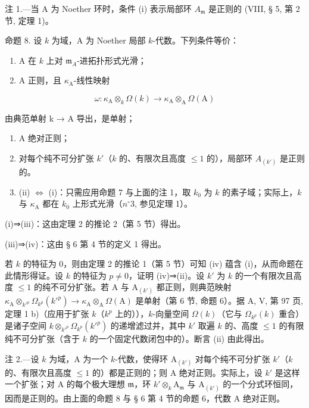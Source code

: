 注 1.—当 A 为 Noether 环时，条件 (i) 表示局部环 \(A_{\mathfrak{m}}\) 是正则的 (VIII, § 5, 第 2 节, 定理 1)。

命题 8. 设 \(k\) 为域，A 为 Noether 局部 \(k\)-代数。下列条件等价：

\begin{enumerate}
\def\labelenumi{(\roman{enumi})}
\item
  A 在 \(k\) 上对 \(\mathfrak{m}_{A}\)-进拓扑形式光滑；
\item
  A 正则，且 \(\kappa_{\mathrm{A}}\)-线性映射
\end{enumerate}

\[
\omega : \kappa_ {\mathrm{A}} \otimes_ {k} \Omega (k) \longrightarrow \kappa_ {\mathrm{A}} \otimes_ {\mathrm{A}} \Omega (\mathrm{A})
\]

由典范单射 k → A 导出，是单射；

\begin{enumerate}
\def\labelenumi{(\roman{enumi})}
\setcounter{enumi}{2}
\item
  A 绝对正则；
\item
  对每个纯不可分扩张 \(k'\)（\(k\) 的、有限次且高度 \(\leqslant 1\) 的），局部环 \(A_{(k')}\) 是正则的。
\item
  (ii) \(\Leftrightarrow\) (i)：只需应用命题 7 与上面的注 1，取 \(k_{0}\) 为 \(k\) 的素子域；实际上，\(k\) 与 \(\kappa_{\mathrm{A}}\) 都在 \(k_{0}\) 上形式光滑（\(n^{\circ}3\), 参见定理 1）。
\end{enumerate}

(i)⇒(iii)：这由定理 2 的推论 2（第 5 节）得出。

(iii)⇒(iv)：这由 § 6 第 4 节的定义 1 得出。

若 \(k\) 的特征为 0，则由定理 2 的推论 1（第 5 节）可知 (iv) 蕴含 (i)，从而命题在此情形得证。设 \(k\) 的特征为 \(p \neq 0\)，证明 (iv)⇒(ii)。设 \(k'\) 为 \(k\) 的一个有限次且高度 \(\leqslant 1\) 的纯不可分扩张。若 A 与 \(\mathrm{A}_{(k')}\) 都正则，则典范映射 \(\kappa_{\mathrm{A}} \otimes_{k'^{p}} \Omega_{k^{p}}(k'^{p}) \longrightarrow \kappa_{\mathrm{A}} \otimes_{\mathrm{A}} \Omega(\mathrm{A})\) 是单射（第 6 节, 命题 6）。据 A, V, 第 97 页, 定理 1 b)（应用于扩张 \(k\)（\(k^{p}\) 上的）），\(k\)-向量空间 \(\Omega(k)\)（它与 \(\Omega_{k^{p}}(k)\) 重合）是诸子空间 \(k \otimes_{k'^{p}} \Omega_{k^{p}}(k'^{p})\) 的递增滤过并，其中 \(k'\) 取遍 \(k\) 的、高度 \(\leqslant 1\) 的有限纯不可分扩张（含于 \(k\) 的一个固定代数闭包中的）。断言 (ii) 由此得出。

注 2.—设 \(k\) 为域，A 为一个 \(k\)-代数，使得环 \(\mathrm{A}_{(k')}\) 对每个纯不可分扩张 \(k'\)（\(k\) 的、有限次且高度 \(\leqslant 1\) 的）都是正则的；则 A 绝对正则。实际上，设 \(k'\) 是这样一个扩张；对 A 的每个极大理想 \(\mathfrak{m}\)，环 \(k'\otimes_k\mathrm{A}_{\mathfrak{m}}\) 与 \(\mathrm{A}_{(k')}\) 的一个分式环恒同，因而是正则的。由上面的命题 8 与 § 6 第 4 节的命题 6，代数 A 绝对正则。

